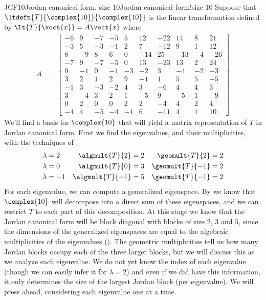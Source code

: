 \begin{example}{JCF10}{Jordan canonical form, size 10}{Jordan canonical form!size 10}
%
Suppose that $\ltdefn{T}{\complex{10}}{\complex{10}}$ is the linear transformation defined by $\lt{T}{\vect{x}}=A\vect{x}$ where
%
\begin{align*}
A&=
\begin{bmatrix}
 -6 & 9 & -7 & -5 & 5 & 12 & -22 & 14 & 8 & 21 \\
 -3 & 5 & -3 & -1 & 2 & 7 & -12 & 9 & 1 & 12 \\
 8 & -9 & 8 & 6 & 0 & -14 & 25 & -13 & -4 & -26 \\
 -7 & 9 & -7 & -5 & 0 & 13 & -23 & 13 & 2 & 24 \\
 0 & -1 & 0 & -1 & -3 & -2 & 3 & -4 & -2 & -3 \\
 3 & 2 & 1 & 2 & 9 & -1 & 1 & 5 & 5 & -5 \\
 -1 & 3 & -3 & -2 & 4 & 3 & -6 & 4 & 4 & 3 \\
 3 & -4 & 3 & 2 & 1 & -5 & 9 & -5 & 1 & -9 \\
 0 & 2 & 0 & 0 & 2 & 2 & -4 & 4 & 2 & 4 \\
 -4 & 4 & -5 & -4 & -1 & 6 & -11 & 4 & 1 & 10
\end{bmatrix}
\end{align*}
%
We'll find a basis for $\complex{10}$ that will yield a matrix representation of $T$ in  Jordan canonical form.  First we find the eigenvalues, and their multiplicities, with the techniques of .
%
\begin{align*}
\lambda&=2  & \algmult{T}{2}&=2  & \geomult{T}{2}&=2\\
\lambda&=0  & \algmult{T}{0}&=3  & \geomult{T}{-1}&=2\\
\lambda&=-1 & \algmult{T}{-1}&=5 & \geomult{T}{-1}&=2
\end{align*}
%
For each eigenvalue, we can compute a generalized eigenspace.  By  we know that $\complex{10}$ will decompose into a direct sum of these eigenspaces, and we can restrict $T$ to each part of this decomposition.  At this stage we know that the Jordan canonical form will be block diagonal with blocks of size $2$, $3$ and $5$, since the dimensions of the generalized eigenspaces are equal to the algebraic multiplicities of the eigenvalues ().  The geometric multiplicities tell us how many Jordan blocks occupy each of the three larger blocks, but we will discuss this as we analyze each eigenvalue.  We do not yet know the index of each eigenvalue (though we can easily infer it for $\lambda=2$) and even if we did have this information, it only determines the size of the largest Jordan block (per eigenvalue).  We will press ahead, considering each eigenvalue one at a time.\par

\end{example}
